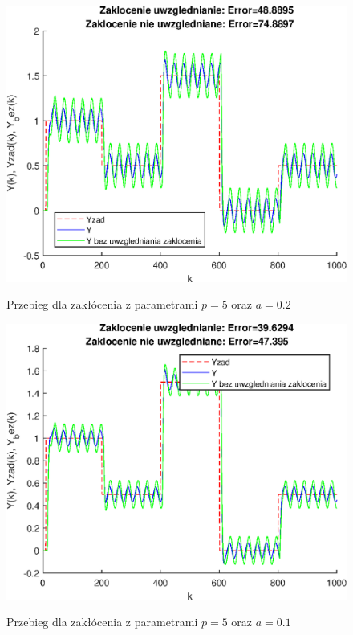 \begin{figure}[h!]
	\centering
	\includegraphics[scale=1]{Rys/sin5_5}
	\label{fig:sin5_5}
	\caption{Przebieg dla zakłócenia z parametrami $p=5$ oraz $a=0.2$}
\end{figure}
\begin{figure}[h!]
	\centering
	\includegraphics[scale=1]{Rys/sin5_10}
	\label{fig:sin5_10}
	\caption{Przebieg dla zakłócenia z parametrami $p=5$ oraz $a=0.1$}
\end{figure}
